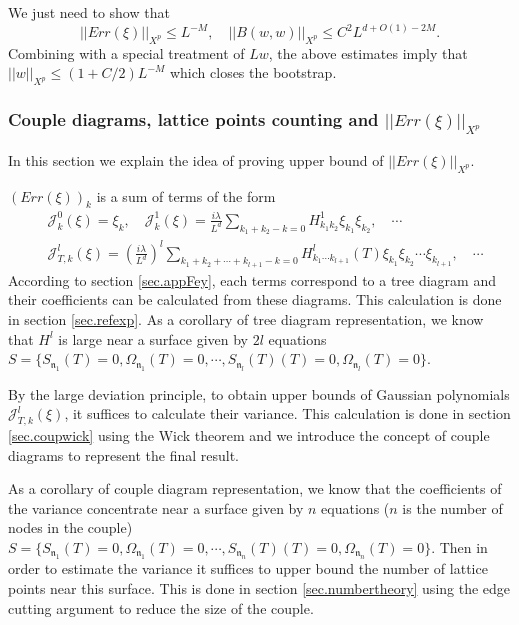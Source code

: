 We just need to show that 
\begin{equation}
    ||Err(\xi)||_{X^p}\le L^{-M},
    \quad ||B(w,w)||_{X^p}\le C^2L^{d+O(1)-2M}.
\end{equation}
Combining with a special treatment of $Lw$, the above estimates imply that $||w||_{X^p}\le (1+C/2)L^{-M}$ which closes the bootstrap.


\subsubsection{Couple diagrams, lattice points counting and $||Err(\xi)||_{X^p}$}\label{sec.latticeintro} In this section we explain the idea of proving upper bound of $||Err(\xi)||_{X^p}$.

$(Err(\xi))_{k}$ is a sum of terms of the form
\begin{equation}
\begin{split}
    &\mathcal{J}_{k}^0(\xi)=  \xi_k, \quad \mathcal{J}_k^1(\xi)=\frac{i\lambda}{L^{d}} \sum_{k_1+k_2-k=0} H^1_{k_1k_2}  \xi_{k_1}\xi_{k_2} , \quad\cdots  \\
    &\mathcal{J}_{T,k}^l(\xi)=\left(\frac{i\lambda}{L^{d}}\right)^l\sum_{k_1+k_2+\cdots+k_{l+1}-k=0} H^l_{k_1\cdots k_{l+1}}(T)  \xi_{k_1}\xi_{k_2}\cdots\xi_{k_{l+1}}, \quad\cdots 
\end{split}
\end{equation}
According to section \ref{sec.appFey}, each terms correspond to a tree diagram and their coefficients can be calculated from these diagrams. This calculation is done in section \ref{sec.refexp}. As a corollary of tree diagram representation, we know that $H^l$ is large near a surface given by $2l$ equations $S=\{S_{\mathfrak{n}_1}(T)=0,\Omega_{\mathfrak{n}_1}(T)=0,\cdots,S_{\mathfrak{n}_{l}}(T)(T)=0,\Omega_{\mathfrak{n}_l}(T)=0\}$.

By the large deviation principle, to obtain upper bounds of Gaussian polynomials $\mathcal{J}_{T,k}^l(\xi)$, it suffices to calculate their variance. This calculation is done in section \ref{sec.coupwick} using the Wick theorem and we introduce the concept of couple diagrams to represent the final result. 

As a corollary of couple diagram representation, we know that the coefficients of the variance concentrate near a surface given by $n$ equations ($n$ is the number of nodes in the couple) $S=\{S_{\mathfrak{n}_1}(T)=0,\Omega_{\mathfrak{n}_1}(T)=0,\cdots,S_{\mathfrak{n}_{n}}(T)(T)=0,\Omega_{\mathfrak{n}_n}(T)=0\}$. Then in order to estimate the variance it suffices to upper bound the number of lattice points near this surface. This is done in section \ref{sec.numbertheory} using the edge cutting argument to reduce the size of the couple. 

